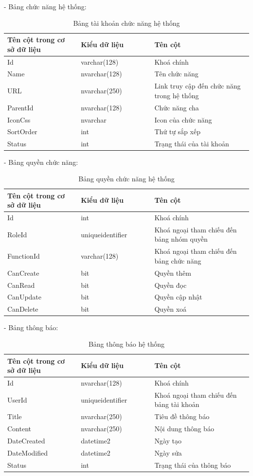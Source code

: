 - Bảng chức năng hệ thống:
\begin{longtable}[htp]{ |m{0.3\linewidth}|m{0.3\linewidth}|m{0.4\linewidth}|}
 \caption{Bảng tài khoản chức năng hệ thống \label{database}}\\
 \hline
 Tên cột trong cơ sở dữ liệu & Kiểu dữ liệu & Tên cột  \\
 \hline
  Id&varchar(128)&Khoá chính\\
 \hline
  Name&nvarchar(128)&Tên chức năng\\
 \hline
  URL&nvarchar(250)&Link truy cập đến chức năng trong hệ thống\\
 \hline
  ParentId&nvarchar(128)& Chức năng cha\\
 \hline
  IconCss&nvarchar&Icon của chức năng\\
 \hline
  SortOrder&int&Thứ tự sắp xếp\\
 \hline
  Status&int&Trạng thái của tài khoản\\
 \hline
\end{longtable}

- Bảng quyền chức năng:
\begin{longtable}[htp]{ |m{0.3\linewidth}|m{0.3\linewidth}|m{0.4\linewidth}|}
 \caption{Bảng quyền chức năng hệ thống \label{database}}\\
 \hline
 Tên cột trong cơ sở dữ liệu & Kiểu dữ liệu & Tên cột  \\
 \hline
  Id&int&Khoá chính\\
 \hline
  RoleId&uniqueidentifier&Khoá ngoại tham chiếu đến bảng nhóm quyền\\
 \hline
  FunctionId&varchar(128)&Khoá ngoại tham chiếu đến bảng chức năng\\
 \hline
  CanCreate&bit& Quyền thêm\\
 \hline
  CanRead&bit&Quyền đọc\\
 \hline
  CanUpdate&bit&Quyền cập nhật\\
 \hline
  CanDelete&bit&Quyền xoá\\
 \hline
\end{longtable}
\newpage
- Bảng thông báo:
\begin{longtable}[htp]{ |m{0.3\linewidth}|m{0.3\linewidth}|m{0.4\linewidth}|}
 \caption{Bảng thông báo hệ thống \label{database}}\\
 \hline
 Tên cột trong cơ sở dữ liệu & Kiểu dữ liệu & Tên cột  \\
 \hline
  Id&nvarchar(128)&Khoá chính\\
 \hline
  UserId&uniqueidentifier&Khoá ngoại tham chiếu đến bảng tài khoản\\
 \hline
  Title&nvarchar(250)&Tiêu đề thông báo\\
 \hline
  Content&nvarchar(250)& Nội dung thông báo\\
 \hline
  DateCreated&datetime2&Ngày tạo\\
 \hline
  DateModified&datetime2&Ngày sửa\\
 \hline
  Status&int&Trạng thái của thông báo\\
 \hline
\end{longtable}

